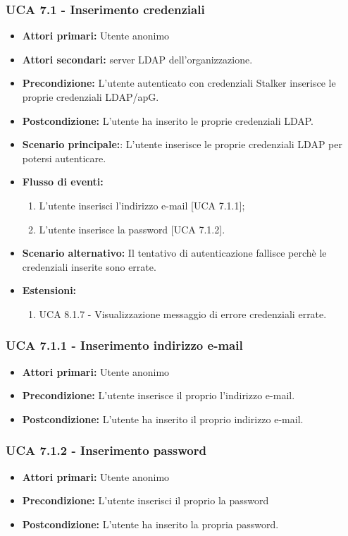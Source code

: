\subsubsection{UCA 7.1 - Inserimento credenziali}
\begin{itemize}
	\item \textbf{Attori primari:} Utente anonimo 
	\item \textbf{Attori secondari:} server LDAP dell'organizzazione.
	\item \textbf{Precondizione:} L'utente autenticato con credenziali Stalker inserisce le proprie credenziali LDAP/ap{G}.
	\item \textbf{Postcondizione:} L'utente ha inserito le proprie credenziali LDAP.
	\item \textbf{Scenario principale:}: L'utente inserisce le proprie credenziali LDAP per potersi autenticare.
	\item \textbf{Flusso di eventi:}
	\begin{enumerate}
		\item L'utente inserisci l'indirizzo e-mail [UCA 7.1.1];
		\item L'utente inserisce la password [UCA 7.1.2].
	\end{enumerate}
	\item \textbf{Scenario alternativo:} Il tentativo di autenticazione fallisce perchè le credenziali inserite sono errate.
	\item \textbf{Estensioni:}
	\begin{enumerate}
		\item UCA 8.1.7 - Visualizzazione messaggio di errore credenziali errate.
	\end{enumerate}
\end{itemize}

\subsubsection{UCA 7.1.1 - Inserimento indirizzo e-mail}%
\begin{itemize}
	\item \textbf{Attori primari:} Utente anonimo
	\item \textbf{Precondizione:} L'utente inserisce il proprio l'indirizzo e-mail.
	\item \textbf{Postcondizione:} L'utente ha inserito il proprio indirizzo e-mail.
\end{itemize}

\subsubsection{UCA 7.1.2 - Inserimento password}%
\begin{itemize}
	\item \textbf{Attori primari:} Utente anonimo
	\item \textbf{Precondizione:} L'utente inserisci il proprio la password
	\item \textbf{Postcondizione:} L'utente ha inserito la propria password.
\end{itemize}
